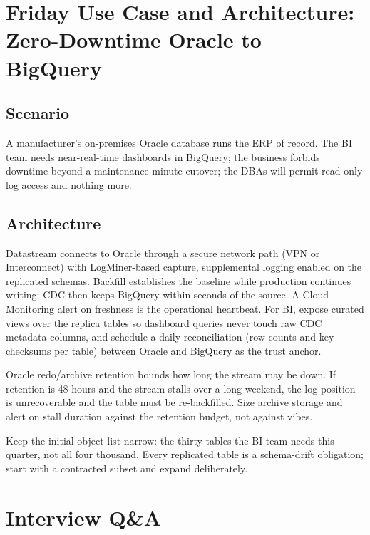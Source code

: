 \section{Friday Use Case and Architecture: Zero-Downtime Oracle to BigQuery}

\subsection{Scenario}
A manufacturer's on-premises Oracle database runs the ERP of record. The BI team needs near-real-time dashboards in BigQuery; the business forbids downtime beyond a maintenance-minute cutover; the DBAs will permit read-only log access and nothing more.

\subsection{Architecture}
Datastream connects to Oracle through a secure network path (VPN or Interconnect) with LogMiner-based capture, supplemental logging enabled on the replicated schemas. Backfill establishes the baseline while production continues writing; CDC then keeps BigQuery within seconds of the source. A Cloud Monitoring alert on freshness is the operational heartbeat. For BI, expose curated views over the replica tables so dashboard queries never touch raw CDC metadata columns, and schedule a daily reconciliation (row counts and key checksums per table) between Oracle and BigQuery as the trust anchor.

\begin{pitfall}
Oracle redo/archive retention bounds how long the stream may be down. If retention is 48 hours and the stream stalls over a long weekend, the log position is unrecoverable and the table must be re-backfilled. Size archive storage and alert on stall duration against the retention budget, not against vibes.
\end{pitfall}

\begin{tipbox}
Keep the initial object list narrow: the thirty tables the BI team needs this quarter, not all four thousand. Every replicated table is a schema-drift obligation; start with a contracted subset and expand deliberately.
\end{tipbox}

\section{Interview Q\&A}
